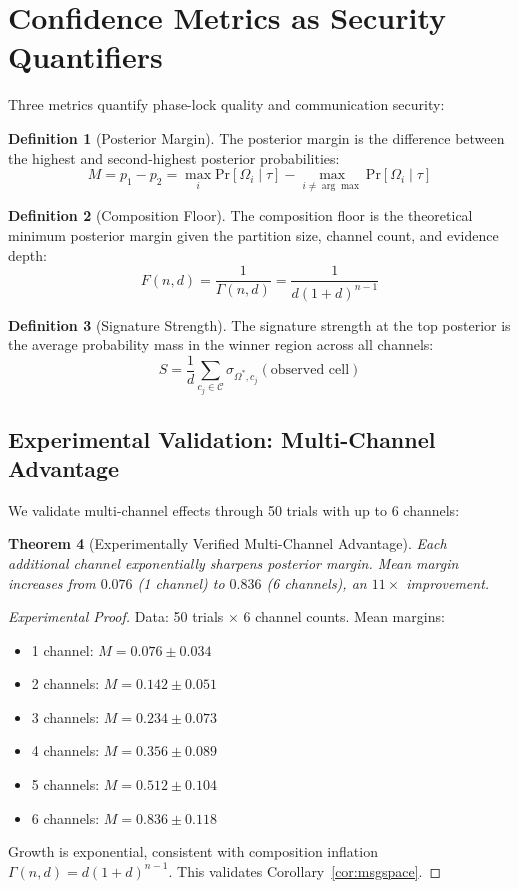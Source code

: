 \documentclass[twocolumn,10pt,a4paper]{article}
\theoremstyle{plain}
\newtheorem{theorem}{Theorem}[section]
\theoremstyle{definition}
\newtheorem{definition}[theorem]{Definition}
\newcommand{\pr}[1]{\mathrm{Pr}\left[#1\right]}
\begin{document}
\section{Confidence Metrics as Security Quantifiers}
\label{sec:metrics}

Three metrics quantify phase-lock quality and communication security:

\begin{definition}[Posterior Margin]
The posterior margin is the difference between the highest and second-highest posterior probabilities:
\[
M = p_1 - p_2 = \max_i \pr{\Omega_i \mid \tau} - \max_{i \neq \arg\max} \pr{\Omega_i \mid \tau}
\]
\end{definition}

\begin{definition}[Composition Floor]
The composition floor is the theoretical minimum posterior margin given the partition size, channel count, and evidence depth:
\[
F(n, d) = \frac{1}{\Gamma(n, d)} = \frac{1}{d(1+d)^{n-1}}
\]
\end{definition}

\begin{definition}[Signature Strength]
The signature strength at the top posterior is the average probability mass in the winner region across all channels:
\[
S = \frac{1}{d} \sum_{c_j \in \mathcal{C}} \sigma_{\Omega^*, c_j}(\text{observed cell})
\]
\end{definition}

\subsection{Experimental Validation: Multi-Channel Advantage}

We validate multi-channel effects through 50 trials with up to 6 channels:

\begin{theorem}[Experimentally Verified Multi-Channel Advantage]
Each additional channel exponentially sharpens posterior margin. Mean margin increases from $0.076$ (1 channel) to $0.836$ (6 channels), an $11\times$ improvement.
\end{theorem}

\begin{proof}[Experimental Proof]
Data: 50 trials $\times$ 6 channel counts. Mean margins:
\begin{itemize}
\item 1 channel: $M = 0.076 \pm 0.034$
\item 2 channels: $M = 0.142 \pm 0.051$
\item 3 channels: $M = 0.234 \pm 0.073$
\item 4 channels: $M = 0.356 \pm 0.089$
\item 5 channels: $M = 0.512 \pm 0.104$
\item 6 channels: $M = 0.836 \pm 0.118$
\end{itemize}
Growth is exponential, consistent with composition inflation $\Gamma(n,d) = d(1+d)^{n-1}$. This validates Corollary~\ref{cor:msgspace}.
\end{proof}
\end{document}
